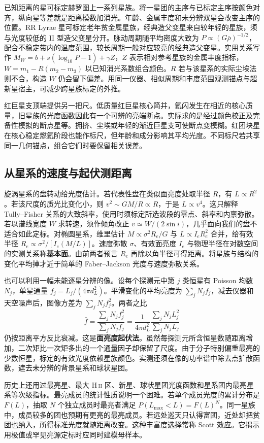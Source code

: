 已知距离的星可标定赫罗图上一系列星族。将一星团的主序与已标定主序按颜色对齐，纵向星等差就是距离模数加消光。年龄、金属丰度和未分辨双星会改变主序的位置。RR Lyrae 星可标定老年贫金属星族，经典造父变星来自较年轻的星族，须与光度较低的 II 型造父变星分开。脉动周期随平均密度大致为 $P\propto(G\bar\rho)^{-1/2}$，配合不稳定带内的温度范围，较长周期一般对应较亮的经典造父变星。实用关系写作 $M_W=b+s(\log_{10}P-1)+\gamma Z$，$Z$ 表示相对参考星族的金属丰度指标，$W=m_1-R(m_2-m_3)$ 以已知消光系数组合颜色。$R$ 若与该星系的实际尘埃法则不合，构造 $W$ 仍会留下偏差。用同一仪器、相似周期和丰度范围观测锚点与超新星宿主，可减少跨星族标定的外推。

红巨星支顶端提供另一把尺。低质量红巨星核心简并，氦闪发生在相近的核心质量，旧星族的光度函数因此有一个可辨的亮端断点。实际求的是经过颜色校正及完备性模拟的断点星等。拥挤、尘埃或年轻的渐近巨星支可使断点变模糊。红团块星在核心稳定燃氦阶段也能作标尺，但年龄和成分影响其平均光度。不同标尺若共享同一几何锚点，组合它们时要保留相关误差。

\subsection{从星系的速度与起伏测距离}

旋涡星系的盘转动给光度估计。若代表性盘在类似面亮度处取半径 $R$，有 $L\propto R^2$。若该尺度的质光比变化小，则 $v^2\sim GM/R\propto R$，于是 $L\propto v^4$。这只解释 Tully--Fisher 关系的大致斜率，使用时须标定所选波段的零点、斜率和内禀弥散。若以谱线宽度 $W$ 求转速，须作倾角改正 $v\simeq W/(2\sin i)$，几乎面向我们的盘不适合如此定标。对椭圆星系，维里估计 $M\propto\sigma^2 R_e/G$ 与 $L\propto I_eR_e^2$ 合并，给有效半径 $R_e\propto \sigma^2/[I_e(M/L)]$。速度弥散 $\sigma$、有效面亮度 $I_e$ 与物理半径在对数空间的实测关系称\textbf{基本面}。由前两者预言 $R_e$ 再除以角半径可得距离。将星族与结构的变化平均掉才近于简单的 Faber--Jackson 光度与速度弥散关系。

也可以利用一幅未能逐星分辨的像。设每个探测元中第 $j$ 类恒星有 Poisson 均数 $N_j$，单星通量 $f_j=L_j/(4\pi d_L^2)$。平滑变化的平均亮度为 $\sum_jN_j f_j$，减去仪器和天空噪声后，图像方差为 $\sum_j N_j f_j^2$。两者之比
\[
 \bar f=\frac{\sum_jN_j f_j^2}{\sum_jN_j f_j}
       =\frac{1}{4\pi d_L^2}\frac{\sum_jN_j L_j^2}{\sum_jN_j L_j}
\]
仍按距离平方反比衰减。这是\textbf{面亮度起伏法}。虽然每探测元所含恒星数随距离增加，二次矩比一次矩多出的一个通量因子却保留了尺度。由于分子特别偏重最亮的少数恒星，标定的有效光度依赖星族颜色。实测还须在像的功率谱中除去点扩散函数，遮去未分辨的背景星系和球状星团。

历史上还用过最亮星、最大 H\,\textsc{ii} 区、新星、球状星团光度函数和星系团内最亮星系等次级指标。最亮成员的统计性质说明一个困难。若单个成员光度的累计分布是 $F(L)$，抽取 $N$ 个独立成员时最亮者满足 $P(L_{\max}<L)=F(L)^N$。同一星族中，成员较多的团也预期有更亮的最亮成员。若远处巡天只认得富团，近处却把贫团也纳入，所得标准光度就随距离改变。这种丰富度选择常称 Scott 效应。它揭示用极值或罕见亮源定标时应同时建模母样本。

